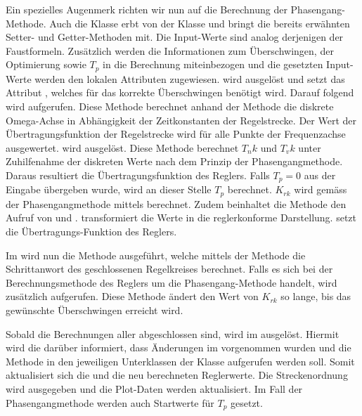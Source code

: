 Ein   spezielles  Augenmerk   richten   wir  nun   auf   die  Berechnung   der
Phasengang-Methode. Auch  die   Klasse     erbt  von
der  Klasse    und  bringt die  bereits  erw\"ahnten  Setter-
und   Getter-Methoden  mit. Die   Input-Werte  sind   analog  derjenigen   der
Faustformeln. Zus\"atzlich  werden  die   Informationen  zum  \"Uberschwingen,
der   Optimierung   sowie   $T_p$   in  die   Berechnung   miteinbezogen   und
die   gesetzten  Input-Werte   werden  den   lokalen  Attributen   zugewiesen.
   wird   ausgel\"ost   und  setzt   das   Attribut
,   welches   f\"ur   das   korrekte   \"Uberschwingen   ben\"otigt
wird. Darauf   folgend  wird     aufgerufen. Diese   Methode
berechnet   anhand   der   Methode      die   diskrete
Omega-Achse  in  Abh\"angigkeit  der  Zeitkonstanten  der  Regelstrecke.   Der
Wert  der  \"Ubertragungsfunktion  der  Regelstrecke wird  f\"ur  alle  Punkte
der Frequenzachse  ausgewertet.   wird ausgel\"ost. Diese
Methode  berechnet   $T_nk$  und  $T_vk$  unter   Zuhilfenahme  der  diskreten
Werte   nach  dem   Prinzip  der   Phasengangmethode. Daraus  resultiert   die
\"Ubertragungsfunktion  des   Reglers. Falls  $T_p   =  0$  aus   der  Eingabe
\"ubergeben   wurde,  wird   an   dieser   Stelle  $T_p$   berechnet. $K_{rk}$
wird    gem\"ass   der    Phasengangmethode   mittels    
berechnet. Zudem    beinhaltet   die    Methode       den
Aufruf     von         und    .
 transformiert die Werte in die reglerkonforme
Darstellung.  setzt die \"Ubertragungs-Funktion des Reglers.

Im   wird  nun die  Methode   ausgef\"uhrt,
welche  mittels der  Methode   die Schrittanwort
des   geschlossenen   Regelkreises   berechnet. Falls    es   sich   bei   der
Berechnungsmethode  des  Reglers  um   die  Phasengang-Methode  handelt,  wird
zus\"atzlich  aufgerufen. Diese Methode \"andert
den Wert von $K_{rk}$ so  lange, bis das gew\"unschte \"Uberschwingen erreicht
wird.

Sobald die  Berechnungen aller  abgeschlossen sind,  wird im
  ausgel\"ost. Hiermit wird die 
dar\"uber  informiert, dass  \"Anderungen im   vorgenommen  wurden
und  die Methode   in  den jeweiligen  Unterklassen der  Klasse
aufgerufen werden soll. Somit aktualisiert sich die  und
die neu  berechneten Reglerwerte. Die Streckenordnung wird  ausgegeben und die
Plot-Daten  werden aktualisiert. Im  Fall  der  Phasengangmethode werden  auch
Startwerte f\"ur $T_p$ gesetzt.

